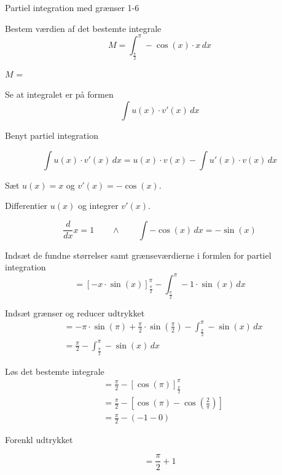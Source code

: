 \documentclass{article}
\begin{document}
\begin{exercise}{Partiel integration med grænser 1-6}
	
	
	Bestem værdien af det bestemte integrale
	\[
	M = \int_{\frac{\pi}{2}}^\pi - \cos(x) \cdot x \, dx
	\]
	
	$M$ =  
	
	
	\hint
	
	Se at integralet er på formen
	\[
	\int u(x) \cdot v'(x) \, dx
	\]
	
	\hint
	
	Benyt partiel integration
	
	\hint
	\[
	\int u(x) \cdot v'(x)\, dx = u(x) \cdot v(x) - \int u'(x) \cdot v(x) \, dx
	\]
	\hint
	
	Sæt $u(x) = x$ og $v'(x) = - \cos(x)$.
	
	
	\hint
	
	Differentier $u(x)$ og integrer $v'(x)$.
	
	\hint
	\[
	\frac{d}{dx}x = 1 \qquad \wedge \qquad \int -\cos(x) \, dx = - \sin(x)
	\]
	
	\hint
	
	Indsæt de fundne størrelser samt grænseværdierne i formlen for partiel integration 
	\[
	= \left[-x \cdot \sin(x) \right]_{\frac{\pi}{2}}^{\pi} - \int_{\frac{\pi}{2}}^{\pi} -1 \cdot \sin(x)  \, dx
	\]
	
	\hint
	
	Indsæt grænser og reducer udtrykket
	\begin{align*}
	&= - \pi \cdot \sin(\pi) + \frac{\pi}{2} \cdot \sin\left(\frac{\pi}{2}\right)  - \int_{\frac{\pi}{2}}^{\pi} -\sin(x) \, dx \\
	&= \frac{\pi}{2}- \int_{\frac{\pi}{2}}^{\pi} -\sin(x) \, dx
	\end{align*}
	
	\hint
	Løs det bestemte integrale
	\begin{align*}
	&= \frac{\pi}{2} - 	\left[ \cos(\pi) \right]_{\frac{\pi}{2}}^{\pi} \\
	&= \frac{\pi}{2} - \left[ \cos(\pi) - \cos\left(\frac{2}{\pi}\right) \right] \\
	&=  \frac{\pi}{2} - (-1 - 0)
	\end{align*}
	
	\hint
	Forenkl udtrykket
	
	\hint
	\[
	= \frac{\pi}{2} + 1
	\]
	
	
	
\end{exercise}
\end{document}
